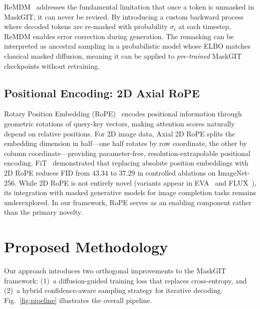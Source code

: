 \documentclass[conference]{IEEEtran}
\begin{document}
ReMDM~\cite{wang2025remdm} addresses the fundamental limitation that once a token is unmasked in MaskGIT, it can never be revised. By introducing a custom backward process where decoded tokens are re-masked with probability $\sigma_t$ at each timestep, ReMDM enables error correction during generation. The remasking can be interpreted as ancestral sampling in a probabilistic model whose ELBO matches classical masked diffusion, meaning it can be applied to \textit{pre-trained} MaskGIT checkpoints without retraining.

\subsection{Positional Encoding: 2D Axial RoPE}

Rotary Position Embedding (RoPE)~\cite{su2021roformer} encodes positional information through geometric rotations of query-key vectors, making attention scores naturally depend on relative positions. For 2D image data, Axial 2D RoPE splits the embedding dimension in half---one half rotates by row coordinate, the other by column coordinate---providing parameter-free, resolution-extrapolable positional encoding. FiT~\cite{lu2024fit} demonstrated that replacing absolute position embeddings with 2D RoPE reduces FID from 43.34 to 37.29 in controlled ablations on ImageNet-256. While 2D RoPE is not entirely novel (variants appear in EVA~\cite{fang2023eva} and FLUX~\cite{flux2024}), its integration with masked generative models for image completion tasks remains underexplored. In our framework, RoPE serves as an enabling component rather than the primary novelty.


\section{Proposed Methodology}
\label{sec:method}

Our approach introduces two orthogonal improvements to the MaskGIT framework: (1)~a diffusion-guided training loss that replaces cross-entropy, and (2)~a hybrid confidence-aware sampling strategy for iterative decoding. Fig.~\ref{fig:pipeline} illustrates the overall pipeline.
\end{document}
